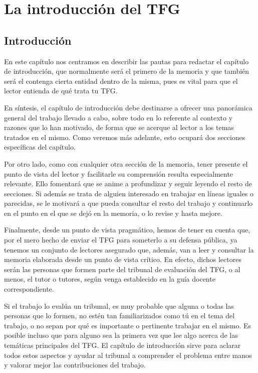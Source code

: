 \chapter{La introducción del TFG}
\label{cap:IntroducciónTFG}

\section{Introducción}

En este capítulo nos centramos en describir las pautas para redactar el capítulo de introducción, que normalmente será el primero de la memoria y que también será el contenga cierta entidad dentro de la misma, pues es vital para que el lector entienda de qué trata tu TFG.

En síntesis, el capítulo de introducción debe destinarse a ofrecer una panorámica general del trabajo llevado a cabo, sobre todo en lo referente al contexto y razones que lo han motivado, de forma que se acerque al lector a los temas tratados en el mismo. Como veremos más adelante, esto ocupará dos secciones específicas del capítulo.

Por otro lado, como con cualquier otra sección de la memoria, tener presente el punto de vista del lector y facilitarle su comprensión resulta especialmente relevante. Ello fomentará que se anime a profundizar y seguir leyendo el resto de secciones. Si además se trata de alguien interesado en trabajar en líneas iguales o parecidas, se le motivará a que pueda consultar el resto del trabajo y continuarlo en el punto en el que se dejó en la memoria, o lo revise y hasta mejore.

Finalmente, desde un punto de vista pragmático, hemos de tener en cuenta que, por el mero hecho de enviar el TFG para someterlo a su defensa pública, ya tenemos un conjunto de lectores asegurado que, además, van a leer y consultar la memoria elaborada desde un punto de vista crítico. En efecto, dichos lectores serán las personas que formen parte del tribunal de evaluación del TFG, o al menos, el tutor o tutores, según venga establecido en la guía docente correspondiente.

Si el trabajo lo evalúa un tribunal, es muy probable que alguna o todas las personas que lo formen, no estén tan familiarizados como tú en el tema del trabajo, o no sepan por qué es importante o pertinente trabajar en el mismo. Es posible incluso que para alguno sea la primera vez que lee algo acerca de las temáticas principales del TFG. El capítulo de introducción sirve para aclarar todos estos aspectos y ayudar al tribunal a comprender el problema entre manos y valorar mejor las contribuciones del trabajo.

